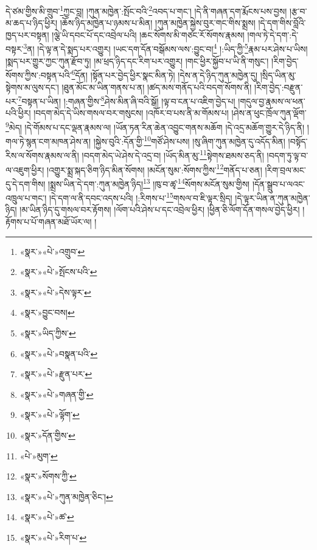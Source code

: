 དེ་ཙམ་གྱིས་མི་གྲུབ་\footnote{«སྣར་»«པེ་»འགྲུབ་}ཀྱང་བླ། །ཀུན་མཁྱེན་:སྤོང་བའི་\footnote{«སྣར་»«པེ་»སྤོངས་པའི་}འབད་པ་གང་། །དེ་ནི་གཞན་དག་རྨོངས་པས་བྱས། །རྩ་བ་མ་ཆད་པ་ཉིད་ཕྱིར། །ཆོས་ཉིད་མཁྱེན་པ་ཉམས་པ་མིན། །ཀུན་མཁྱེན་སྐྱེས་བུར་གང་གིས་སྨྲས། །དེ་དག་གིས་བློའི་ཁྱད་པར་བསྟན། །ལྕེ་ཡི་དབང་པོ་དང་འབྲེལ་པའི། །ཆང་སོགས་མི་གཙང་རོ་སོགས་རྣམས། །གལ་ཏེ་དེ་དག་:དེ་བསྟར་\footnote{«སྣར་»«པེ་»དེས་ལྟར་}ན། །དེ་ལྟ་ན་དེ་སྨད་པར་འགྱུར། །ཡང་དག་དོན་བསྒོམས་ལས་:བྱུང་བ།\footnote{«སྣར་»བྱུང་བས།} །:ཡིད་ཀྱི་\footnote{«སྣར་»ཡིད་ཀྱིས་}རྣམ་པར་ཤེས་པ་ཡིས། །སྨད་པར་གྱུར་ཀྱང་ཀུན་རྫོབ་ཏུ། །མ་ཕྲད་ཉིད་དང་རིག་པར་འགྱུར། །གང་ཕྱིར་སྐྱོབ་པ་ཡི་ནི་གསུང་། །རིག་བྱེད་སོགས་ཀྱིས་:བསྟན་པའི་\footnote{«སྣར་»«པེ་»བསྣན་པའི་}དོན། །སྟོན་པར་བྱེད་ཕྱིར་སྣང་མིན་ཏེ། །དེས་ན་དེ་ཉིད་ཀུན་མཁྱེན་དུ། །སྲིད་ཡིན་མུ་སྟེགས་མ་ལུས་དང་། །ཐུན་མོང་མ་ཡིན་གནས་པ་ན། །ཚད་མས་གནོད་པའི་བདག་སོགས་ནི། །རིག་བྱེད་:བརྫུན་པར་\footnote{«སྣར་»«པེ་»རྫུན་པར་}བསྟན་པ་ཡིན། །:གཞན་གྱིས་\footnote{«སྣར་»«པེ་»གཞན་གྱི་}ཤེས་མིན་ཞི་བའི་སྒོ། །ལྟ་བ་ངན་པ་འཇིག་བྱེད་པ། །གདུལ་བྱ་རྣམས་ལ་ཕན་པའི་ཕྱིར། །བདག་མེད་དེ་ཡིས་གསལ་བར་གསུངས། །འཁོར་བ་པས་ནི་མ་གོམས་པ། །ཤེས་ན་ཕུང་ཁྲོལ་ཀུན་ལྡོག་\footnote{«སྣར་»«པེ་»ལྟོག་}མེད། །དེ་གོམས་པ་དང་ལྡན་རྣམས་ལ། །ཡོན་ཏན་རིན་ཆེན་འབྱུང་གནས་མཆོག །དེ་འདྲ་མཆོག་གྱུར་དེ་ཉིད་ནི། །གལ་ཏེ་སྙན་ངག་མཁན་ཤེས་ན། །སྐྱེས་བུའི་:དོན་གྱི་\footnote{«སྣར་»དོན་གྱིས་}གཙོ་ཤེས་པས། །སུ་ཞིག་ཀུན་མཁྱེན་དུ་འདོད་མིན། །བསྟོད་རིས་ལ་སོགས་རྣམས་ལ་ནི། །བདག་མེད་ཡེ་ཤེས་དེ་འདྲ་བ། །ཡོད་མིན་མུ་\footnote{«པེ་»མུག་}སྟེགས་ཐམས་ཅད་ནི། །བདག་ཏུ་ལྟ་བ་ལ་འཇུག་ཕྱིར། །འགྱུར་སྨྲ་སྐད་ཅིག་ཉིད་མིན་སོགས། །མངོན་སུམ་:སོགས་ཀྱིས་\footnote{«སྣར་»སོགས་ཀྱི་}གནོད་པ་ཅན། །རིག་བྲལ་མང་དུ་དེ་དག་གིས། །སྨྲས་ཡིན་དེ་དག་:ཀུན་མཁྱེན་ཉིད།\footnote{«སྣར་»«པེ་»ཀུན་མཁྱེན་ཅིང་།} །ཁུ་བ་ཚྭ་\footnote{«སྣར་»«པེ་»ཚ་}སོགས་མངོན་སུམ་གྱིས། །དོན་སྒྲུབ་པ་ལའང་འཁྲུལ་པ་གང་། །དེ་དག་ལ་ནི་དབང་འདས་པའི། །:རིགས་པ་\footnote{«སྣར་»«པེ་»རིག་པ་}གསལ་བ་ཇི་ལྟར་སྲིད། །དེ་ལྟར་ཡིན་ན་ཀུན་མཁྱེན་ཉིད། །མ་ཡིན་ཉིད་དུ་གསལ་བར་རྟོགས། །ལོག་པའི་ཤེས་པ་དང་འབྲེལ་ཕྱིར། །ཕྱིན་ཅི་ལོག་དོན་གསལ་བྱེད་ཕྱིར། །རྟོགས་པ་པོ་གཞན་མཐོ་ཡོར་ལ། །
